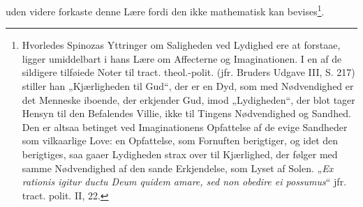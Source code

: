 \documentclass[12pt,a4paper]{book}
\newcommand{\opage}[1]{\marginnote{\footnotesize\textit{[#1]}}}
\begin{document}
\opage{159} \setcounter{footnote}{0}%
uden videre forkaste denne Lære fordi den ikke mathematisk kan bevises\footnote{Hvorledes Spinozas Yttringer om Saligheden ved Lydighed ere at forstaae, ligger umiddelbart i hans Lære om Affecterne og Imaginationen. I en af de sildigere tilføiede Noter til tract. theol.-polit. (jfr. Bruders Udgave III, S. 217) stiller han „Kjærligheden til Gud“, der er en Dyd, som med Nødvendighed er det Menneske iboende, der erkjender Gud, imod „Lydigheden“, der blot tager Hensyn til den Befalendes Villie, ikke til Tingens Nødvendighed og Sandhed. Den er altsaa betinget ved Imaginationens Opfattelse af de evige Sandheder som vilkaarlige Love: en Opfattelse, som Fornuften berigtiger, og idet den berigtiges, saa gaaer Lydigheden strax over til Kjærlighed, der følger med samme Nødvendighed af den sande Erkjendelse, som Lyset af Solen. „\emph{Ex rationis igitur ductu Deum quidem amare, sed non obedire ei possumus}“ jfr. tract. polit. II, 22.}.
\end{document}
